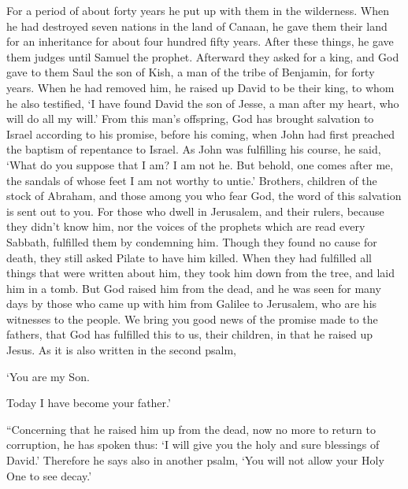 {For a period of about forty years he put up with them in the wilderness.
When he had destroyed seven nations in the land of Canaan, he gave them their land for an inheritance for about four hundred fifty years.
After these things, he gave them judges until Samuel the prophet.
Afterward they asked for a king, and God gave to them Saul the son of Kish, a man of the tribe of Benjamin, for forty years.
When he had removed him, he raised up David to be their king, to whom he also testified, ‘I have found David the son of Jesse, a man after my heart, who will do all my will.’
From this man’s offspring, God has brought salvation to Israel according to his promise,
before his coming, when John had first preached the baptism of repentance to Israel.
As John was fulfilling his course, he said, ‘What do you suppose that I am? I am not he. But behold, one comes after me, the sandals of whose feet I am not worthy to untie.’
Brothers, children of the stock of Abraham, and those among you who fear God, the word of this salvation is sent out to you.
For those who dwell in Jerusalem, and their rulers, because they didn’t know him, nor the voices of the prophets which are read every Sabbath, fulfilled them by condemning him.
Though they found no cause for death, they still asked Pilate to have him killed.
When they had fulfilled all things that were written about him, they took him down from the tree, and laid him in a tomb.
But God raised him from the dead,
and he was seen for many days by those who came up with him from Galilee to Jerusalem, who are his witnesses to the people.
We bring you good news of the promise made to the fathers,
that God has fulfilled this to us, their children, in that he raised up Jesus. As it is also written in the second psalm,
\par }{\Q ‘You are my Son.
\par }{\QB Today I have become your father.’
\par }{\PP {}“Concerning that he raised him up from the dead, now no more to return to corruption, he has spoken thus: ‘I will give you the holy and sure blessings of David.’
Therefore he says also in another psalm, ‘You will not allow your Holy One to see decay.’}
